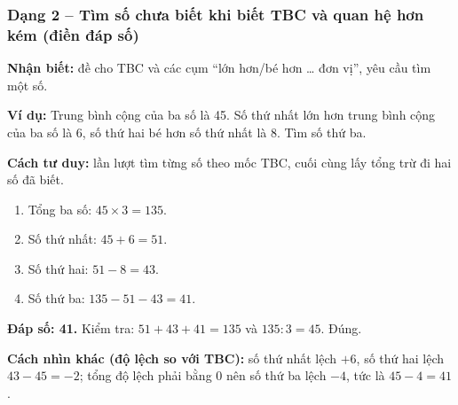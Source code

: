 \documentclass[../main.tex]{subfiles}
\begin{document}
\subsubsection{Dạng 2 -- Tìm số chưa biết khi biết TBC và quan hệ hơn kém (điền đáp số)}
\textbf{Nhận biết:} đề cho TBC và các cụm ``lớn hơn/bé hơn \dots{} đơn vị'', yêu cầu tìm một số.
\begin{vd}
    \textbf{Ví dụ:} Trung bình cộng của ba số là 45. Số thứ nhất lớn hơn trung bình cộng của ba số là 6, số thứ hai bé hơn số thứ nhất là 8. Tìm số thứ ba.
\end{vd}
\textbf{Cách tư duy:} lần lượt tìm từng số theo mốc TBC, cuối cùng lấy tổng trừ đi hai số đã biết.
\begin{enumerate}
    \item Tổng ba số: $45 \times 3 = 135$.
    \item Số thứ nhất: $45 + 6 = 51$.
    \item Số thứ hai: $51 - 8 = 43$.
    \item Số thứ ba: $135 - 51 - 43 = 41$.
\end{enumerate}
\textbf{Đáp số: 41.} Kiểm tra: $51 + 43 + 41 = 135$ và $135 : 3 = 45$. Đúng.

\begin{luuy}
    \textbf{Cách nhìn khác (độ lệch so với TBC):} số thứ nhất lệch $+6$, số thứ hai lệch $43 - 45 = -2$; tổng độ lệch phải bằng $0$ nên số thứ ba lệch $-4$, tức là $45 - 4 = 41$.
\end{luuy}

\end{document}
